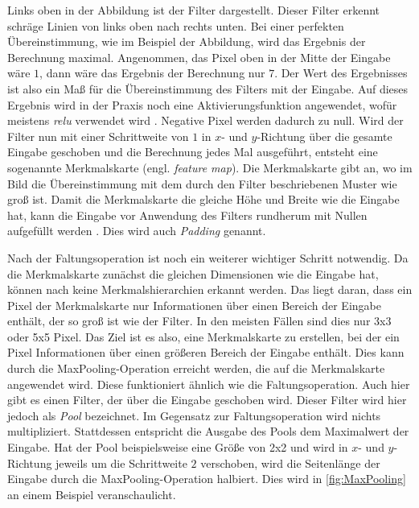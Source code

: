 Links oben in der Abbildung ist der Filter dargestellt.
Dieser Filter erkennt schräge Linien von links oben nach rechts unten.
Bei einer perfekten Übereinstimmung, wie im Beispiel der Abbildung, wird das Ergebnis der Berechnung maximal.
Angenommen, das Pixel oben in der Mitte der Eingabe wäre $1$, dann wäre das Ergebnis der Berechnung nur $7$.
Der Wert des Ergebnisses ist also ein Maß für die Übereinstimmung des Filters mit der Eingabe.
Auf dieses Ergebnis wird in der Praxis noch eine Aktivierungsfunktion angewendet, wofür meistens \emph{\acrshort{relu}} verwendet wird \cite{6S191CNN}.
Negative Pixel werden dadurch zu null.
Wird der Filter nun mit einer Schrittweite von $1$ in $x$- und $y$-Richtung über die gesamte Eingabe geschoben und die Berechnung jedes Mal ausgeführt, entsteht eine sogenannte Merkmalskarte (engl. \emph{feature map}).
Die Merkmalskarte gibt an, wo im Bild die Übereinstimmung mit dem durch den Filter beschriebenen Muster wie groß ist.
Damit die Merkmalskarte die gleiche Höhe und Breite wie die Eingabe hat, kann die Eingabe vor Anwendung des Filters rundherum mit Nullen aufgefüllt werden \cite[S. 168 f.]{DeepLearningPythonKeras}.
Dies wird auch \emph{Padding} genannt.

Nach der Faltungsoperation ist noch ein weiterer wichtiger Schritt notwendig.
Da die Merkmalskarte zunächst die gleichen Dimensionen wie die Eingabe hat, können nach \cite[S. 171]{DeepLearningPythonKeras} keine Merkmalshierarchien erkannt werden.
Das liegt daran, dass ein Pixel der Merkmalskarte nur Informationen über einen Bereich der Eingabe enthält, der so groß ist wie der Filter.
In den meisten Fällen sind dies nur 3x3 oder 5x5 Pixel.
Das Ziel ist es also, eine Merkmalskarte zu erstellen, bei der ein Pixel Informationen über einen größeren Bereich der Eingabe enthält.
Dies kann durch die MaxPooling-Operation erreicht werden, die auf die Merkmalskarte angewendet wird.
Diese funktioniert ähnlich wie die Faltungsoperation.
Auch hier gibt es einen Filter, der über die Eingabe geschoben wird.
Dieser Filter wird hier jedoch als \emph{Pool} bezeichnet.
Im Gegensatz zur Faltungsoperation wird nichts multipliziert.
Stattdessen entspricht die Ausgabe des Pools dem Maximalwert der Eingabe.
Hat der Pool beispielsweise eine Größe von 2x2 und wird in $x$- und $y$-Richtung jeweils um die Schrittweite $2$ verschoben, wird die Seitenlänge der Eingabe durch die MaxPooling-Operation halbiert.
Dies wird in \autoref{fig:MaxPooling} an einem Beispiel veranschaulicht.

